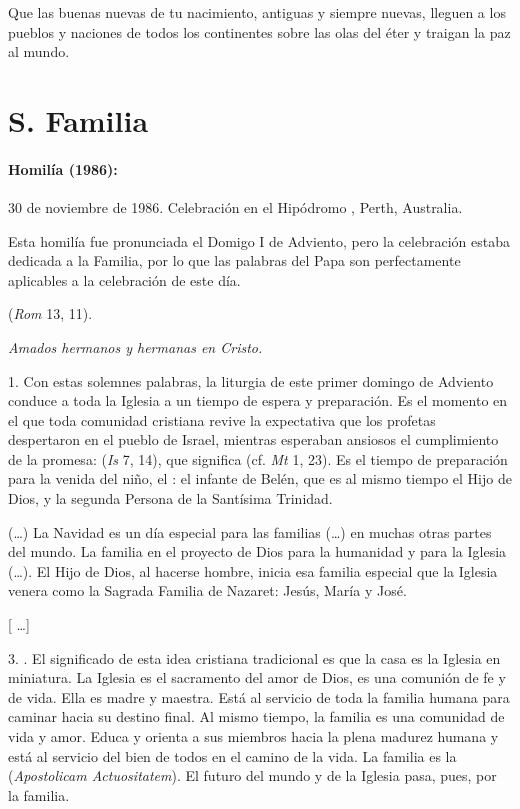 \begin{body}
\begin{body}
		Que las buenas nuevas de tu nacimiento, antiguas y siempre nuevas, lleguen a los pueblos y naciones de todos los continentes sobre las olas del éter y traigan la paz al mundo.
	\end{body}


	\chapter{S. Familia}

	\subsubsection{Homilía (1986):} 30 de noviembre de 1986. Celebración en el Hipódromo , Perth, Australia.

	Esta homilía fue pronunciada el Domigo I de Adviento, pero la celebración estaba dedicada a la Familia, por lo que las palabras del Papa son perfectamente aplicables a la celebración de este día.

	\begin{body}
		 (\emph{Rom} 13, 11).

		\emph{Amados hermanos y hermanas en Cristo.}

		1. Con estas solemnes palabras, la liturgia de este primer domingo de Adviento conduce a toda la Iglesia a un tiempo de espera y preparación. Es el momento en el que toda comunidad cristiana revive la expectativa que los profetas despertaron en el pueblo de Israel, mientras esperaban ansiosos el cumplimiento de la promesa:  (\emph{Is} 7, 14), que significa  (cf. \emph{Mt} 1, 23). Es el tiempo de preparación para la venida del niño, el : el infante de Belén, que es al mismo tiempo el Hijo de Dios, y la segunda Persona de la Santísima Trinidad.

		(\ldots{}) La Navidad es un día especial para las familias (\ldots{}) en muchas otras partes del mundo. La familia en el proyecto de Dios para la humanidad y para la Iglesia (\ldots{}). El Hijo de Dios, al hacerse hombre, inicia esa familia especial que la Iglesia venera como la Sagrada Familia de Nazaret: Jesús, María y José.

		{[} \ldots{}{]}

		3. . El significado de esta idea cristiana tradicional es que la casa es la Iglesia en miniatura. La Iglesia es el sacramento del amor de Dios, es una comunión de fe y de vida. Ella es madre y maestra. Está al servicio de toda la familia humana para caminar hacia su destino final. Al mismo tiempo, la familia es una comunidad de vida y amor. Educa y orienta a sus miembros hacia la plena madurez humana y está al servicio del bien de todos en el camino de la vida. La familia es la  ({\emph{Apostolicam Actuositatem}}). El futuro del mundo y de la Iglesia pasa, pues, por la familia.


\end{body}
\end{body}
